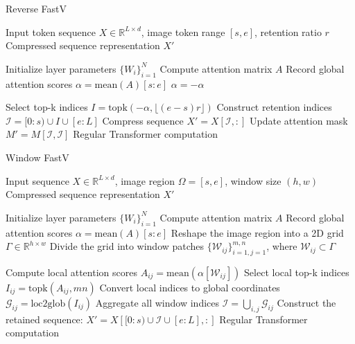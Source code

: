\begin{algorithm}[t]
\caption{Reverse FastV}
\label{alg:reverse_fastv}
\begin{algorithmic}[1]
\Require Input token sequence $X \in \mathbb{R}^{L \times d}$, image token range $[s,e]$, retention ratio $r$
\Ensure Compressed sequence representation $X'$

\State Initialize layer parameters $\{W_i\}_{i=1}^N$
        \State Compute attention matrix $A$
        \State Record global attention scores $\alpha = \text{mean}(A)[s:e]$
        \State $\alpha = -\alpha$ \Comment{\textcolor{blue}{Difference from Vanilla FastV}}
        
        \State Select top-k indices $I=\text{topk}(-\alpha, \lfloor (e-s)r \rfloor)$ 
        \State Construct retention indices $\mathcal{I} = [0:s) \cup I \cup [e:L]$
        \State Compress sequence $X' = X[\mathcal{I},:]$
        \State Update attention mask $M' = M[\mathcal{I},\mathcal{I}]$
    \Else
        \State Regular Transformer computation
    \EndIf
\EndFor
\end{algorithmic}
\end{algorithm}


\begin{algorithm}[t]
\caption{Window FastV}
\label{alg:window_fastv}
\begin{algorithmic}[1]
\Require Input sequence $X \in \mathbb{R}^{L \times d}$, image region $\Omega=[s,e]$, window size $(h,w)$ %
\Ensure Compressed sequence representation $X'$

\State Initialize layer parameters $\{W_i\}_{i=1}^N$
        \State Compute attention matrix $A$
        \State Record global attention scores $\alpha = \text{mean}(A)[s:e]$
        \State Reshape the image region into a 2D grid $\Gamma \in \mathbb{R}^{h\times w}$
        \State Divide the grid into window patches $\{\mathcal{W}_{ij}\}_{i=1,j=1}^{m,n}$, where $\mathcal{W}_{ij} \subset \Gamma$
        
            \State Compute local attention scores $A_{ij} = \text{mean}(\alpha[\mathcal{W}_{ij}])$
            \State Select local top-k indices $I_{ij} = \text{topk}(A_{ij}, mn)$
            \State Convert local indices to global coordinates $\mathcal{G}_{ij} = \text{loc2glob}(I_{ij})$
        \EndFor
        \State Aggregate all window indices $\mathcal{I} = \bigcup_{i,j} \mathcal{G}_{ij}$
        \State Construct the retained sequence:
        $
        X' = X\left[[0:s) \cup \mathcal{I} \cup [e:L], :\right]
        $
    \Else
        \State Regular Transformer computation
    \EndIf
\EndFor
\end{algorithmic}
\end{algorithm}


